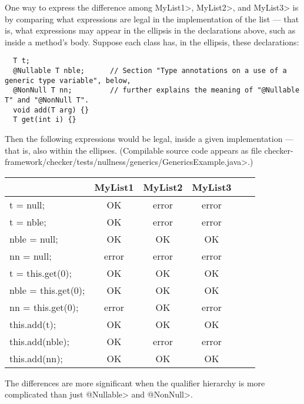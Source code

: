 One way to express the difference among \<MyList1>, \<MyList2>, and
\<MyList3> is by comparing what expressions are legal in the implementation
of the list --- that is, what expressions may appear in the ellipsis in the
declarations above, such as inside a method's body.  Suppose each class
has, in the ellipsis, these declarations:

\begin{Verbatim}
  T t;
  @Nullable T nble;      // Section "Type annotations on a use of a generic type variable", below,
  @NonNull T nn;         // further explains the meaning of "@Nullable T" and "@NonNull T".
  void add(T arg) {}
  T get(int i) {}
\end{Verbatim}

\noindent
Then the following expressions would be legal, inside a given
implementation --- that is, also within the ellipses.
(Compilable source code appears as file
\<checker-framework/checker/tests/nullness/generics/GenericsExample.java>.)

\begin{tabular}{|l|c|c|c|c|c|} \hline
                        & MyList1 & MyList2 & MyList3 \\ \hline
  t = null;             & OK      & error   & error   \\ \hline
  t = nble;             & OK      & error   & error   \\ \hline
  nble = null;          & OK      & OK      & OK      \\ \hline
  nn = null;            & error   & error   & error   \\ \hline
  t = this.get(0);      & OK      & OK      & OK      \\ \hline
  nble = this.get(0);   & OK      & OK      & OK      \\ \hline
  nn = this.get(0);     & error   & OK      & error   \\ \hline
  this.add(t);          & OK      & OK      & OK      \\ \hline
  this.add(nble);       & OK      & error   & error   \\ \hline
  this.add(nn);         & OK      & OK      & OK      \\ \hline
\end{tabular}


The differences are more
significant when the qualifier hierarchy is more complicated than just
\<@Nullable> and \<@NonNull>.

